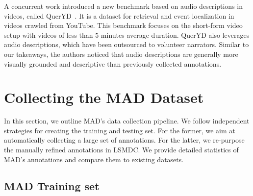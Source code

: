 \documentclass[10pt,twocolumn,letterpaper]{article}
\begin{document}
A concurrent work introduced a new benchmark based on audio descriptions in videos, called QuerYD~\cite{9414640}. It is a dataset for retrieval and event localization in videos crawled from YouTube. This benchmark focuses on the short-form video setup with videos of less than $5$ minutes average duration. QuerYD also leverages audio descriptions, which have been outsourced to volunteer narrators. Similar to our takeaways, the authors noticed that audio descriptions are generally more visually grounded and descriptive than previously collected annotations.



 \section{Collecting the MAD Dataset}\label{sec: method}

In this section, we outline MAD's data collection pipeline. We follow independent strategies for creating the training and testing set. For the former, we aim at automatically collecting a large set of annotations. For the latter, we re-purpose the manually refined annotations in LSMDC. We provide detailed statistics of MAD's annotations and compare them to existing  datasets.

\subsection{MAD Training set}
\label{section::train-set}
\end{document}
